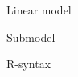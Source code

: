 \documentclass[smaller]{beamer}
\begin{document}
\begin{frame}{Linear model}
 
\end{frame}

\begin{frame}{Submodel}
 
\end{frame}

\begin{frame}{R-syntax}

\end{frame}




\end{document}
